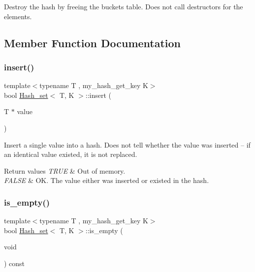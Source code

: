 Destroy the hash by freeing the buckets table. Does not call destructors for the elements. 

\subsection{Member Function Documentation}
\mbox{\label{classHash__set_ae8cd34c7227a2fd2c288a687dad59fad}} 
\subsubsection{\texorpdfstring{insert()}{insert()}}
{\footnotesize\ttfamily template$<$typename T , my\+\_\+hash\+\_\+get\+\_\+key K$>$ \\
bool \mbox{\hyperlink{classHash__set}{Hash\+\_\+set}}$<$ T, K $>$\+::insert (\begin{DoxyParamCaption}\item[{T $\ast$}]{value }\end{DoxyParamCaption})\hspace{0.3cm}{\ttfamily [inline]}}

Insert a single value into a hash. Does not tell whether the value was inserted -- if an identical value existed, it is not replaced.


\begin{DoxyRetVals}{Return values}
{\em T\+R\+UE} & Out of memory. \\
\hline
{\em F\+A\+L\+SE} & OK. The value either was inserted or existed in the hash. \\
\hline
\end{DoxyRetVals}
\mbox{\label{classHash__set_a60a9d58549e8eee25c0f934b9a13ae5c}} 
\subsubsection{\texorpdfstring{is\+\_\+empty()}{is\_empty()}}
{\footnotesize\ttfamily template$<$typename T , my\+\_\+hash\+\_\+get\+\_\+key K$>$ \\
bool \mbox{\hyperlink{classHash__set}{Hash\+\_\+set}}$<$ T, K $>$\+::is\+\_\+empty (\begin{DoxyParamCaption}\item[{void}]{ }\end{DoxyParamCaption}) const\hspace{0.3cm}{\ttfamily [inline]}}

